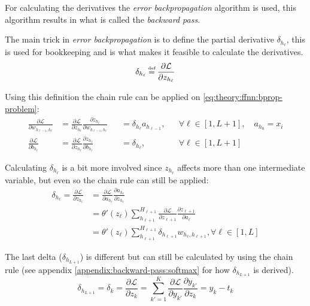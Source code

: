 For calculating the derivatives the \textit{error backpropagation} algorithm is used, this algorithm results in what is called the \textit{backward pass}.

The main trick in \textit{error backpropagation} is to define the partial derivative $\delta_{h_\ell}$, this is used for bookkeeping and is what makes it feasible to calculate the derivatives.
\begin{equation}
\delta_{h_\ell} \defeq \frac{\partial \mathcal{L}}{\partial z_{h_\ell}}
\end{equation}

Using this definition the chain rule can be applied on \eqref{eq:theory:ffnn:bprop-problem}:
\begin{equation}
\begin{aligned}
\frac{\partial \mathcal{L}}{\partial w_{h_{\ell-1}, h_\ell}} &= \frac{\partial \mathcal{L}}{\partial z_{h_\ell}} \frac{\partial z_{h_\ell}}{\partial w_{h_{\ell-1}, h_\ell}} &&= \delta_{h_\ell} a_{h_{\ell-1}},&& \forall \ell \in [1, L+1],\quad a_{h_0} = x_i \\
\frac{\partial \mathcal{L}}{\partial b_{h_\ell}} &= \frac{\partial \mathcal{L}}{\partial z_{h_\ell}} \frac{\partial z_{h_\ell}}{\partial b_{h_\ell}} &&= \delta_{h_\ell},&& \forall \ell \in [1, L+1]
\end{aligned}
\end{equation}


Calculating $\delta_{h_\ell}$ is a bit more involved since $z_{h_\ell}$ affects more than one intermediate variable, but even so the chain rule can still be applied:
\begin{equation}
\begin{aligned}
\delta_{h_\ell} = \frac{\partial \mathcal{L}}{\partial z_{h_\ell}} &= \frac{\partial \mathcal{L}}{\partial a_{h_\ell}} \frac{\partial a_{h_\ell}}{\partial z_{h_\ell}} \\
&= \theta'(z_\ell) \sum_{h_{\ell+1}}^{H_{\ell+1}} \frac{\partial \mathcal{L}}{\partial z_{\ell+1}} \frac{\partial z_{\ell+1}}{\partial a_\ell} \\
&= \theta'(z_\ell) \sum_{h_{\ell+1}}^{H_{\ell+1}} \delta_{h_{\ell+1}} w_{h_\ell, h_{\ell+1}}, \forall \ell \in [1, L]
\end{aligned}
\label{eq:theory:ffnn:bprop}
\end{equation}

The last delta ($\delta_{h_{L+1}}$) is different but can still be calculated by using the chain rule (see appendix \ref{appendix:backward-pass:softmax} for how $\delta_{h_{L+1}}$ is derived).
\begin{equation}
\delta_{h_{L + 1}} = \delta_k = \frac{\partial \mathcal{L}}{\partial z_k} = \sum_{k'=1}^K \frac{\partial \mathcal{L}}{\partial y_{k'}} \frac{\partial y_{k'}}{\partial z_k} = y_k - t_k
\label{eq:theory:ffnn:bprop-delta-last}
\end{equation}

